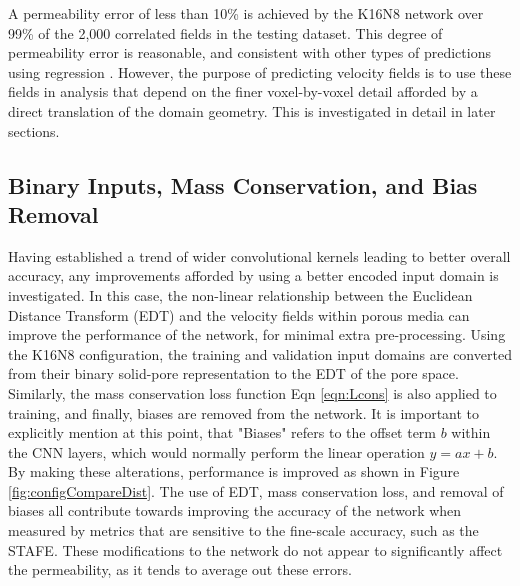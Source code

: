 \documentclass{article}
\begin{document}
A permeability error of less than 10\% is achieved by the K16N8 network over 99\% of the 2,000 correlated fields in the testing dataset. This degree of permeability error is reasonable, and consistent with other types of predictions using regression \cite{RN114}. However, the purpose of predicting velocity fields is to use these fields in analysis that depend on the finer voxel-by-voxel detail afforded by a direct translation of the domain geometry. This is investigated in detail in later sections.

\subsection{Binary Inputs, Mass Conservation, and Bias Removal}
\label{sec:geomvsDistvsMass}

Having established a trend of wider convolutional kernels leading to better overall accuracy, any improvements afforded by using a better encoded input domain is investigated. In this case, the non-linear relationship between the Euclidean Distance Transform (EDT) and the velocity fields within porous media can improve the performance of the network, for minimal extra pre-processing. Using the K16N8 configuration, the training and validation input domains are converted from their binary solid-pore representation to the EDT of the pore space. Similarly, the mass conservation loss function Eqn \ref{eqn:Lcons} is also applied to training, and finally, biases are removed from the network. It is important to explicitly mention at this point, that "Biases" refers to the offset term $b$ within the CNN layers, which would normally perform the linear operation $y=ax+b$. By making these alterations, performance is improved as shown in Figure \ref{fig:configCompareDist}. The use of EDT, mass conservation loss, and removal of biases all contribute towards improving the accuracy of the network when measured by metrics that are sensitive to the fine-scale accuracy, such as the STAFE. These modifications to the network do not appear to significantly affect the permeability, as it tends to average out these errors.
\end{document}
